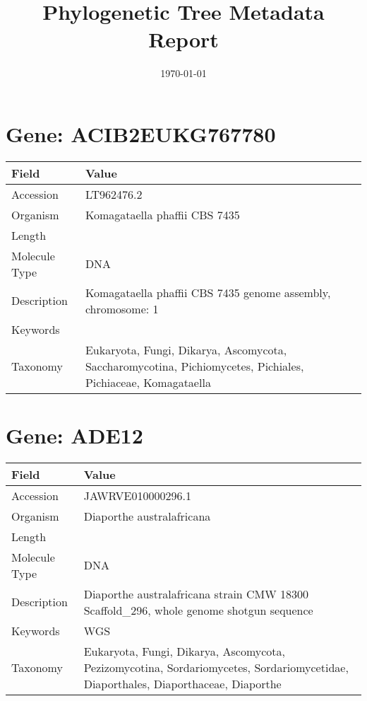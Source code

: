 \documentclass[10pt]{article}
\title{Phylogenetic Tree Metadata Report}
\date{\today}
\begin{document}
\maketitle
\tableofcontents
\clearpage
{}
\clearpage

\section*{Gene: ACIB2EUKG767780}
{\footnotesize
\begin{longtable}{>{\raggedright\arraybackslash}p{4.5cm} >{\raggedright\arraybackslash}p{11.5cm}}
\textbf{Field} & \textbf{Value} \\
\hline
Accession & LT962476.2 \\
Organism & Komagataella phaffii CBS 7435 \\
Length & 2895357 \\
Molecule Type & DNA \\
Description & Komagataella phaffii CBS 7435 genome assembly, chromosome: 1 \\
Keywords &  \\
Taxonomy & Eukaryota, Fungi, Dikarya, Ascomycota, Saccharomycotina, Pichiomycetes, Pichiales, Pichiaceae, Komagataella \\
\end{longtable}
}


\section*{Gene: ADE12}
{\footnotesize
\begin{longtable}{>{\raggedright\arraybackslash}p{4.5cm} >{\raggedright\arraybackslash}p{11.5cm}}
\textbf{Field} & \textbf{Value} \\
\hline
Accession & JAWRVE010000296.1 \\
Organism & Diaporthe australafricana \\
Length & 20257 \\
Molecule Type & DNA \\
Description & Diaporthe australafricana strain CMW 18300 Scaffold\_296, whole genome shotgun sequence \\
Keywords & WGS \\
Taxonomy & Eukaryota, Fungi, Dikarya, Ascomycota, Pezizomycotina, Sordariomycetes, Sordariomycetidae, Diaporthales, Diaporthaceae, Diaporthe \\
\end{longtable}
}
\end{document}

